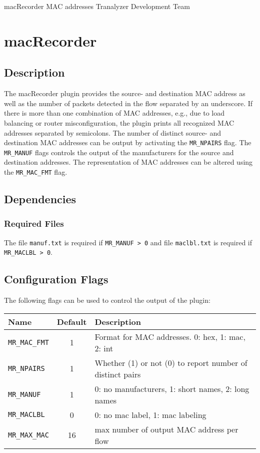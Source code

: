 \documentclass[documentation]{subfiles}
\begin{document}
\trantitle
    {macRecorder}
    {MAC addresses}
    {Tranalyzer Development Team} %

\section{macRecorder}\label{s:macRecorder}

\subsection{Description}
The macRecorder plugin provides the source- and destination MAC address as well as the number of packets detected in the flow separated by an underscore. If there is more than one combination of MAC addresses, e.g., due to load balancing or router misconfiguration, the plugin prints all recognized MAC addresses separated by semicolons. The number of distinct source- and destination MAC addresses can be output by activating the {\tt MR\_NPAIRS} flag. The {\tt MR\_MANUF} flags controls the output of the manufacturers for the source and destination addresses. The representation of MAC addresses can be altered using the {\tt MR\_MAC\_FMT} flag.

\subsection{Dependencies}

\subsubsection{Required Files}
The file {\tt manuf.txt} is required if {\tt MR\_MANUF > 0} and file {\tt maclbl.txt} is required if {\tt MR\_MACLBL > 0}.

\subsection{Configuration Flags}
The following flags can be used to control the output of the plugin:
\begin{longtable}{lcl}
    \toprule
    {\bf Name} & {\bf Default} & {\bf Description}\\
    \midrule\endhead%
    {\tt MR\_MAC\_FMT} & 1  & Format for MAC addresses. 0: hex, 1: mac, 2: int\\
    {\tt MR\_NPAIRS}   & 1  & Whether (1) or not (0) to report number of distinct pairs\\
    {\tt MR\_MANUF}    & 1  & 0: no manufacturers, 1: short names, 2: long names\\
    {\tt MR\_MACLBL}   & 0  & 0: no mac label, 1: mac labeling\\
    {\tt MR\_MAX\_MAC} & 16 & max number of output MAC address per flow\\
    \bottomrule
\end{longtable}
\end{document}
